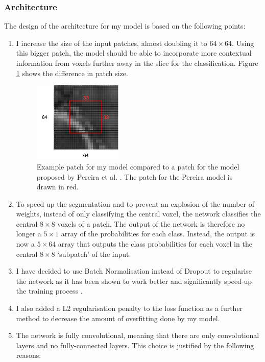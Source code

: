 \documentclass[12pt,a4paper,twoside,openright]{report}
\begin{document}
\subsubsection{Architecture}
The design of the architecture for my model is based on the following points:
\begin{enumerate}
	\item I increase the size of the input patches, almost doubling it to $64 \times 64$. Using this bigger patch, the model should be able to incorporate more contextual information from voxels further away in the slice for the classification. Figure \ref{fig:bigger_patches} shows the difference in patch size.
		\begin{figure}
			\centering
			\includegraphics[width=0.4\textwidth]{bigger_patches}
			\caption[Example patch for my model compared to a patch for the model proposed by Pereira et al. \cite{pereira}]{Example patch for my model compared to a patch for the model proposed by Pereira et al. \cite{pereira}. The patch for the Pereira model is drawn in red.}
			\label{fig:bigger_patches}
		\end{figure}
	\item To speed up the segmentation and to prevent an explosion of the number of weights, instead of only classifying the central voxel, the network classifies the central $8 \times 8$ voxels of a patch. The output of the network is therefore no longer a $5 \times 1$ array of the probabilities for each class. Instead, the output is now a $5 \times 64$ array that outputs the class probabilities for each voxel in the central $8 \times 8$ `subpatch' of the input. 
	\item I have decided to use Batch Normalisation instead of Dropout to regularise the network as it has been shown to work better and significantly speed-up the training process \cite{batch_normalization}. 
	\item I also added a L2 regularisation penalty to the loss function as a further method to decrease the amount of overfitting done by my model.
	\item The network is fully convolutional, meaning that there are only convolutional layers and no fully-connected layers. This choice is justified by the following reasons:

\end{enumerate}
\end{document}

